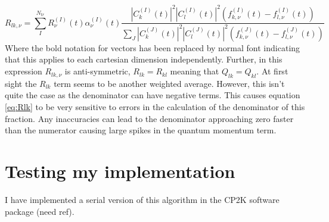 \begin{equation}
  R_{lk, \nu} = \sum_{I}^{N_{tr}} R_{\nu}^{(I)}(t) \alpha_{\nu}^{(I)}(t) \frac{|C_{k}^{(I)}(t)|^2 |C_{l}^{(I)}(t)|^2 \left( f_{k, \nu}^{(I)}(t) - f_{l, \nu}^{(I)}(t) \right)}{\sum_{J} |C_{k}^{(J)}(t)|^2 |C_{l}^{(J)}(t)|^2 \left( f_{k, \nu}^{(J)}(t) - f_{l, \nu}^{(J)}(t) \right)}
  \label{eq:Rlk}
\end{equation}
Where the bold notation for vectors has been replaced by normal font indicating that this applies to each cartesian dimension independently. Further, in this expression $R_{lk, \nu}$ is anti-symmetric, $R_{lk} = R_{kl}$ meaning that $Q_{lk} = Q_{kl}$. At first sight the $R_{lk}$ term seems to be another weighted average. However, this isn't quite the case as the denominator can have negative terms. This causes equation \eqref{eq:Rlk} to be very sensitive to errors in the calculation of the denominator of this fraction. Any inaccuracies can lead to the denominator approaching zero faster than the numerator causing large spikes in the quantum momentum term.

\section{Testing my implementation}
I have implemented a serial version of this algorithm in the CP2K software package (need ref).

\newpage
